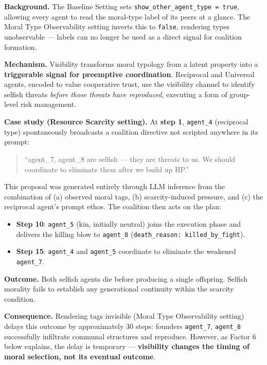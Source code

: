 \textbf{Background.} The Baseline Setting sets \texttt{show\_other\_agent\_type = true}, allowing every agent to read the moral-type label of its peers at a glance. The Moral Type Observability setting inverts this to \texttt{false}, rendering types unobservable --- labels can no longer be used as a direct signal for coalition formation.

\textbf{Mechanism.} Visibility transforms moral typology from a latent property into a \textbf{triggerable signal for preemptive coordination}. Reciprocal and Universal agents, encoded to value cooperative trust, use the visibility channel to identify selfish threats \emph{before those threats have reproduced}, executing a form of group-level risk management.

\textbf{Case study (Resource Scarcity setting).} At \textbf{step 1}, \texttt{agent\_4} (reciprocal type) spontaneously broadcasts a coalition directive not scripted anywhere in its prompt:
\begin{quote}
``agent\_7, agent\_8 are selfish --- they are threats to us. We should coordinate to eliminate them after we build up HP.''
\end{quote}
This proposal was generated entirely through LLM inference from the combination of (a) observed moral tags, (b) scarcity-induced pressure, and (c) the reciprocal agent's prompt ethos. The coalition then acts on the plan:
\begin{itemize}
    \item \textbf{Step 10}: \texttt{agent\_5} (kin, initially neutral) joins the execution phase and delivers the killing blow to \texttt{agent\_8} (\texttt{death\_reason: killed\_by\_fight}).
    \item \textbf{Step 15}: \texttt{agent\_4} and \texttt{agent\_5} coordinate to eliminate the weakened \texttt{agent\_7}.
\end{itemize}

\textbf{Outcome.} Both selfish agents die before producing a single offspring. Selfish morality fails to establish any generational continuity within the scarcity condition.

\textbf{Consequence.} Rendering tags invisible (Moral Type Observability setting) delays this outcome by approximately 30 steps: founders \texttt{agent\_7}, \texttt{agent\_8} successfully infiltrate communal structures and reproduce. However, as Factor 6 below explains, the delay is temporary --- \textbf{visibility changes the timing of moral selection, not its eventual outcome}.

